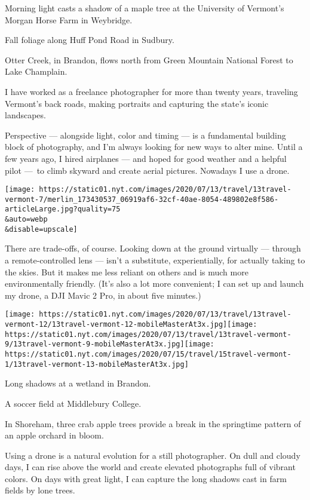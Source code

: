 Morning light casts a shadow of a maple tree at the University of
Vermont's Morgan Horse Farm in Weybridge.

Fall foliage along Huff Pond Road in Sudbury.

Otter Creek, in Brandon, flows north from Green Mountain National Forest
to Lake Champlain.

I have worked as a freelance photographer for more than twenty years,
traveling Vermont's back roads, making portraits and capturing the
state's iconic landscapes.

Perspective --- alongside light, color and timing --- is a fundamental
building block of photography, and I'm always looking for new ways to
alter mine. Until a few years ago, I hired airplanes --- and hoped for
good weather and a helpful pilot ---~to climb skyward and create aerial
pictures. Nowadays I use a drone.

\texttt{[image: https://static01.nyt.com/images/2020/07/13/travel/13travel-vermont-7/merlin\_173430537\_06919af6-32cf-40ae-8054-489802e8f586-articleLarge.jpg?quality=75\\\&auto=webp\\\&disable=upscale]}

There are trade-offs, of course. Looking down at the ground virtually
--- through a remote-controlled lens --- isn't a substitute,
experientially, for actually taking to the skies. But it makes me less
reliant on others and is much more environmentally friendly. (It's also
a lot more convenient; I can set up and launch my drone, a DJI Mavic 2
Pro, in about five minutes.)

\texttt{[image: https://static01.nyt.com/images/2020/07/13/travel/13travel-vermont-12/13travel-vermont-12-mobileMasterAt3x.jpg]}\texttt{[image: https://static01.nyt.com/images/2020/07/13/travel/13travel-vermont-9/13travel-vermont-9-mobileMasterAt3x.jpg]}\texttt{[image: https://static01.nyt.com/images/2020/07/15/travel/15travel-vermont-1/13travel-vermont-13-mobileMasterAt3x.jpg]}

Long shadows at a wetland in Brandon.

A soccer field at Middlebury College.

In Shoreham, three crab apple trees provide a break in the springtime
pattern of an apple orchard in bloom.

Using a drone is a natural evolution for a still photographer. On dull
and cloudy days, I can rise above the world and create elevated
photographs full of vibrant colors. On days with great light, I can
capture the long shadows cast in farm fields by lone trees.

